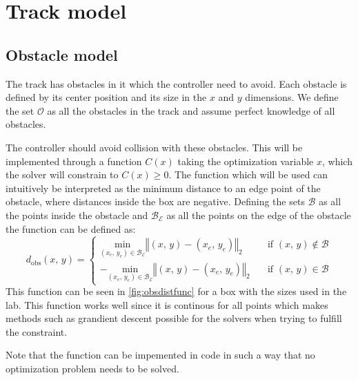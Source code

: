 \documentclass{article}
\begin{document}
\section{Track model}

\subsection{Obstacle model}
The track has obstacles in it which the controller need to avoid. Each obstacle is defined by its center position and its size in the $x$ and $y$ dimensions. We define the set $\mathcal{O}$ as all the obstacles in the track and assume perfect knowledge of all obstacles.

The controller should avoid collision with these obstacles. This will be implemented through a function $C(x)$ taking the optimization variable $x$, which the solver will constrain to $C(x) \geq 0$. The function which will be used can intuitively be interpreted as the minimum distance to an edge point of the obstacle, where distances inside the box are negative. Defining the sets $\mathcal{B}$ as all the points inside the obstacle and $\mathcal{B}_\mathcal{E}$ as all the points on the edge of the obstacle the function can be defined as:
\begin{equation}
  d_{\mathrm{obs}}(x,\,y) = \begin{cases}
    \underset{(x_e,\,y_e)\in\mathcal{B}_{\mathcal{E}}}{\text{min}} \left\Vert(x,\,y) - (x_e,\,y_e)\right\Vert_2 & \quad\text{if } (x,\,y) \notin \mathcal{B} \\
    - \underset{(x_e,\,y_e)\in\mathcal{B}_{\mathcal{E}}}{\text{min}} \left\Vert(x,\,y) - (x_e,\,y_e)\right\Vert_2 & \quad\text{if } (x,\,y) \in \mathcal{B}
  \end{cases}
\end{equation}
This function can be seen in \cref{fig:obsdistfunc} for a box with the sizes used in the lab. This function works well since it is continous for all points which makes methods such as grandient descent possible for the solvers when trying to fulfill the constraint.

Note that the function can be impemented in code in such a way that no optimization problem needs to be solved.
\end{document}
